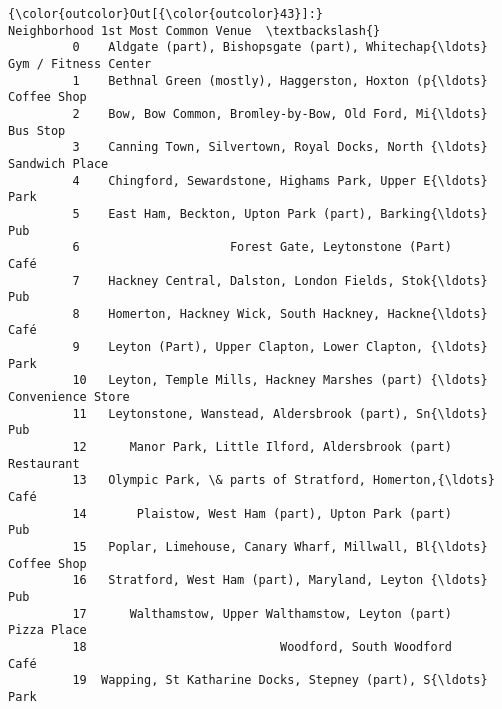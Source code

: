 \documentclass[11pt]{article}
\begin{document}
\begin{Verbatim}[commandchars=\\\{\}]
{\color{outcolor}Out[{\color{outcolor}43}]:}                                          Neighborhood 1st Most Common Venue  \textbackslash{}
         0    Aldgate (part), Bishopsgate (part), Whitechap{\ldots}  Gym / Fitness Center   
         1    Bethnal Green (mostly), Haggerston, Hoxton (p{\ldots}           Coffee Shop   
         2    Bow, Bow Common, Bromley-by-Bow, Old Ford, Mi{\ldots}              Bus Stop   
         3    Canning Town, Silvertown, Royal Docks, North {\ldots}        Sandwich Place   
         4    Chingford, Sewardstone, Highams Park, Upper E{\ldots}                  Park   
         5    East Ham, Beckton, Upton Park (part), Barking{\ldots}                   Pub   
         6                     Forest Gate, Leytonstone (Part)                  Café   
         7    Hackney Central, Dalston, London Fields, Stok{\ldots}                   Pub   
         8    Homerton, Hackney Wick, South Hackney, Hackne{\ldots}                  Café   
         9    Leyton (Part), Upper Clapton, Lower Clapton, {\ldots}                  Park   
         10   Leyton, Temple Mills, Hackney Marshes (part) {\ldots}     Convenience Store   
         11   Leytonstone, Wanstead, Aldersbrook (part), Sn{\ldots}                   Pub   
         12      Manor Park, Little Ilford, Aldersbrook (part)            Restaurant   
         13   Olympic Park, \& parts of Stratford, Homerton,{\ldots}                  Café   
         14       Plaistow, West Ham (part), Upton Park (part)                   Pub   
         15   Poplar, Limehouse, Canary Wharf, Millwall, Bl{\ldots}           Coffee Shop   
         16   Stratford, West Ham (part), Maryland, Leyton {\ldots}                   Pub   
         17      Walthamstow, Upper Walthamstow, Leyton (part)           Pizza Place   
         18                           Woodford, South Woodford                  Café   
         19  Wapping, St Katharine Docks, Stepney (part), S{\ldots}                  Park   
         

\end{Verbatim}
\end{document}
